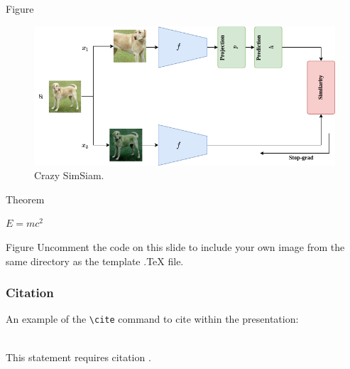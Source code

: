 \documentclass[aspectratio=169,xcolor=dvipsnames]{beamer}
\begin{document}

\begin{frame}{Figure}
\begin{figure}
    \centering
    \includegraphics[scale=0.5]{figures/simsiam.png}
    \caption{Crazy SimSiam.}
    \label{fig:my_label}
\end{figure}
\end{frame}


\begin{frame}{Theorem}
    \begin{theorem}
        $E = mc^2$
    \end{theorem}
\end{frame}


\begin{frame}{Figure}
    Uncomment the code on this slide to include your own image from the same directory as the template .TeX file.
\end{frame}


\begin{frame}[fragile] %
    \frametitle{Citation}
    An example of the \verb|\cite| command to cite within the presentation:\\~

    This statement requires citation \cite{p1}.
\end{frame}



\end{document}
